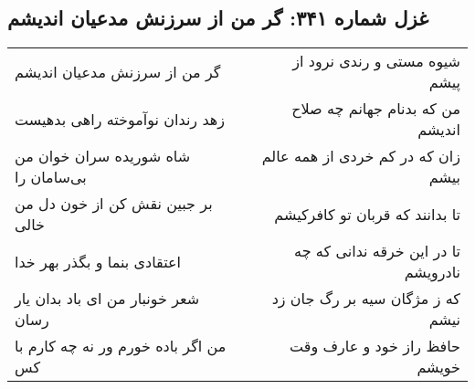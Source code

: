 \begin{center}
\section*{غزل شماره ۳۴۱: گر من از سرزنش مدعیان اندیشم}
\label{sec:sh341}
\begin{longtable}{l p{0.5cm} r}
گر من از سرزنش مدعیان اندیشم
&&
شیوه مستی و رندی نرود از پیشم
\\
زهد رندان نوآموخته راهی بدهیست
&&
من که بدنام جهانم چه صلاح اندیشم
\\
شاه شوریده سران خوان من بی‌سامان را
&&
زان که در کم خردی از همه عالم بیشم
\\
بر جبین نقش کن از خون دل من خالی
&&
تا بدانند که قربان تو کافرکیشم
\\
اعتقادی بنما و بگذر بهر خدا
&&
تا در این خرقه ندانی که چه نادرویشم
\\
شعر خونبار من ای باد بدان یار رسان
&&
که ز مژگان سیه بر رگ جان زد نیشم
\\
من اگر باده خورم ور نه چه کارم با کس
&&
حافظ راز خود و عارف وقت خویشم
\\
\end{longtable}
\end{center}
